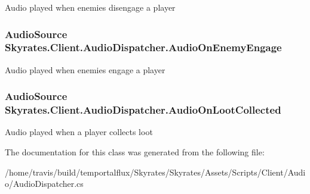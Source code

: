 Audio played when enemies disengage a player 

\hypertarget{class_skyrates_1_1_client_1_1_audio_dispatcher_a2f4d4827e4638cf83404fc4f557bfef5}{
\subsubsection[{Audio\-On\-Enemy\-Engage}]{\setlength{\rightskip}{0pt plus 5cm}Audio\-Source Skyrates.\-Client.\-Audio\-Dispatcher.\-Audio\-On\-Enemy\-Engage}}\label{class_skyrates_1_1_client_1_1_audio_dispatcher_a2f4d4827e4638cf83404fc4f557bfef5}


Audio played when enemies engage a player 

\hypertarget{class_skyrates_1_1_client_1_1_audio_dispatcher_ab8a146c252b56f67a02579b6b65bc299}{
\subsubsection[{Audio\-On\-Loot\-Collected}]{\setlength{\rightskip}{0pt plus 5cm}Audio\-Source Skyrates.\-Client.\-Audio\-Dispatcher.\-Audio\-On\-Loot\-Collected}}\label{class_skyrates_1_1_client_1_1_audio_dispatcher_ab8a146c252b56f67a02579b6b65bc299}


Audio played when a player collects loot 



The documentation for this class was generated from the following file\-:\begin{DoxyCompactItemize}
\item 
/home/travis/build/temportalflux/\-Skyrates/\-Skyrates/\-Assets/\-Scripts/\-Client/\-Audio/Audio\-Dispatcher.\-cs\end{DoxyCompactItemize}
